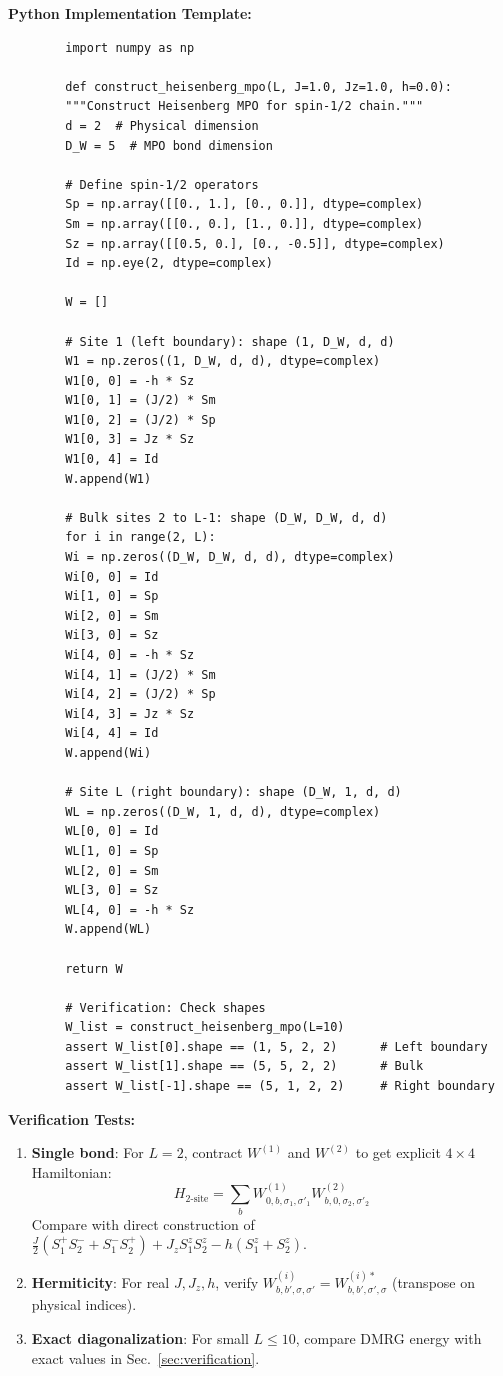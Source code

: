 \documentclass[aps,prb,onecolumn,scriptaddress]{revtex4-2}
\begin{document}
	\textbf{Python Implementation Template:}
	\begin{verbatim}
		import numpy as np
		
		def construct_heisenberg_mpo(L, J=1.0, Jz=1.0, h=0.0):
		"""Construct Heisenberg MPO for spin-1/2 chain."""
		d = 2  # Physical dimension
		D_W = 5  # MPO bond dimension
		
		# Define spin-1/2 operators
		Sp = np.array([[0., 1.], [0., 0.]], dtype=complex)
		Sm = np.array([[0., 0.], [1., 0.]], dtype=complex)
		Sz = np.array([[0.5, 0.], [0., -0.5]], dtype=complex)
		Id = np.eye(2, dtype=complex)
		
		W = []
		
		# Site 1 (left boundary): shape (1, D_W, d, d)
		W1 = np.zeros((1, D_W, d, d), dtype=complex)
		W1[0, 0] = -h * Sz
		W1[0, 1] = (J/2) * Sm
		W1[0, 2] = (J/2) * Sp
		W1[0, 3] = Jz * Sz
		W1[0, 4] = Id
		W.append(W1)
		
		# Bulk sites 2 to L-1: shape (D_W, D_W, d, d)
		for i in range(2, L):
		Wi = np.zeros((D_W, D_W, d, d), dtype=complex)
		Wi[0, 0] = Id
		Wi[1, 0] = Sp
		Wi[2, 0] = Sm
		Wi[3, 0] = Sz
		Wi[4, 0] = -h * Sz
		Wi[4, 1] = (J/2) * Sm
		Wi[4, 2] = (J/2) * Sp
		Wi[4, 3] = Jz * Sz
		Wi[4, 4] = Id
		W.append(Wi)
		
		# Site L (right boundary): shape (D_W, 1, d, d)
		WL = np.zeros((D_W, 1, d, d), dtype=complex)
		WL[0, 0] = Id
		WL[1, 0] = Sp
		WL[2, 0] = Sm
		WL[3, 0] = Sz
		WL[4, 0] = -h * Sz
		W.append(WL)
		
		return W
		
		# Verification: Check shapes
		W_list = construct_heisenberg_mpo(L=10)
		assert W_list[0].shape == (1, 5, 2, 2)      # Left boundary
		assert W_list[1].shape == (5, 5, 2, 2)      # Bulk
		assert W_list[-1].shape == (5, 1, 2, 2)     # Right boundary
	\end{verbatim}
	
	\textbf{Verification Tests:}
	\begin{enumerate}
		\item \textbf{Single bond}: For $L=2$, contract $W^{(1)}$ and $W^{(2)}$ to get explicit $4 \times 4$ Hamiltonian:
		\begin{equation}
			H_{2\text{-site}} = \sum_{b} W^{(1)}_{0,b,\sigma_1,\sigma'_1} W^{(2)}_{b,0,\sigma_2,\sigma'_2}
		\end{equation}
		Compare with direct construction of $\frac{J}{2}(S_1^+ S_2^- + S_1^- S_2^+) + J_z S_1^z S_2^z - h(S_1^z + S_2^z)$.
		
		\item \textbf{Hermiticity}: For real $J, J_z, h$, verify $W^{(i)}_{b,b',\sigma,\sigma'} = W^{(i)*}_{b,b',\sigma',\sigma}$ (transpose on physical indices).
		
		\item \textbf{Exact diagonalization}: For small $L \leq 10$, compare DMRG energy with exact values in Sec.~\ref{sec:verification}.
	\end{enumerate}
	
\end{document}
